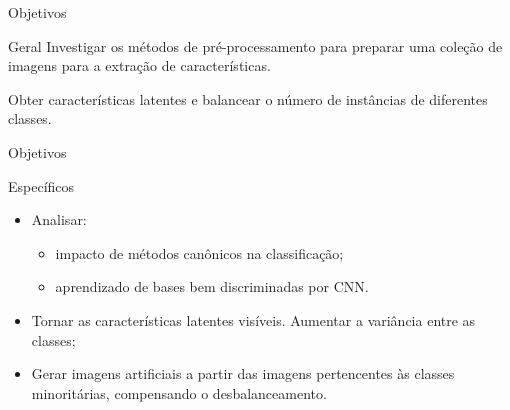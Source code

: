 \documentclass{beamer}
\begin{document}
\begin{frame}{Objetivos}
\setlength\leftmargini{1em}
\justifying
  \begin{block}{Geral}
  \justifying
  Investigar os métodos de pré-processamento para preparar uma coleção de imagens para a extração de características.

  \vspace{5mm}
  Obter características latentes e balancear o número de instâncias de diferentes classes.
  \end{block}
\end{frame}
\begin{frame}{Objetivos}
\setlength\leftmargini{1em}
\justifying
  \begin{block}{Específicos}
    \justifying
    \begin{itemize}
      \item Analisar: 
        \begin{itemize}
          \item impacto de métodos canônicos na classificação;
          \item aprendizado de bases bem discriminadas por CNN.
        \end{itemize}
      \item Tornar as características latentes visíveis. Aumentar a variância entre as classes;%
      \item Gerar imagens artificiais a partir das imagens pertencentes às classes minoritárias, compensando o desbalanceamento. 
    \end{itemize}
  \end{block}
\end{frame}
\end{document}
